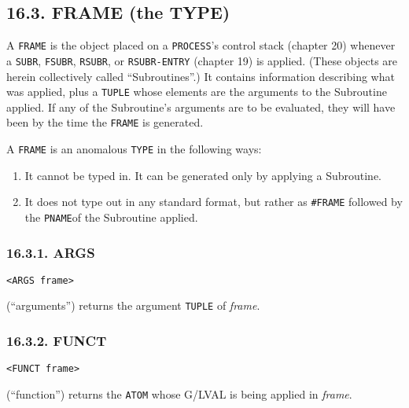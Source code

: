 \documentclass[a4paper,]{article}
\providecommand{\tightlist}{%
  \setlength{\itemsep}{0pt}\setlength{\parskip}{0pt}}
\begin{document}
\subsection{16.3. FRAME (the TYPE)}\label{frame-the-type}

A \texttt{FRAME} is the object placed on a \texttt{PROCESS}'s control stack (chapter 20)
whenever a \texttt{SUBR}, \texttt{FSUBR}, \texttt{RSUBR},
or \texttt{RSUBR-ENTRY} (chapter 19) is applied. (These objects are herein collectively called
``Subroutines''.) It contains information describing what was applied, plus a \texttt{TUPLE}
whose elements are the arguments to the Subroutine applied. If any of the Subroutine's arguments are to be evaluated, they
will have been by the time the \texttt{FRAME} is generated.

A \texttt{FRAME} is an anomalous \texttt{TYPE} in the following ways:

\begin{enumerate}
\def\labelenumi{\arabic{enumi}.}
\tightlist
\item
  It cannot be typed in. It can be generated only by applying a Subroutine.
\item
  It does not type out in any standard format, but rather as \texttt{\#FRAME} followed by the \texttt{PNAME}of the
  Subroutine applied.
\end{enumerate}

\subsubsection{16.3.1. ARGS}\label{args-1}

\begin{verbatim}
<ARGS frame>
\end{verbatim}

 (``arguments'') returns the argument \texttt{TUPLE} of \emph{frame}.

\subsubsection{16.3.2. FUNCT}\label{funct}

\begin{verbatim}
<FUNCT frame>
\end{verbatim}

 (``function'') returns the \texttt{ATOM} whose G/LVAL is being applied
in \emph{frame}.
\end{document}
